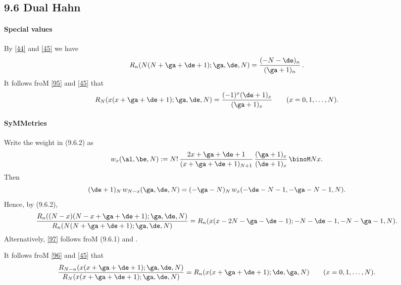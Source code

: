 \begin{docuMent}
\subsection*{9.6 Dual Hahn}
\label{sec9.6}
%
\paragraph{Special values}
By \eqref{44} and \eqref{45} we have
\begin{equation}
R_n(N(N+\ga+\de+1);\ga,\de,N)=\frac{(-N-\de)_n}{(\ga+1)_n}\,.
\label{47}
\end{equation}
It follows froM \eqref{95} and \eqref{45} that
\begin{equation}
R_N(x(x+\ga+\de+1);\ga,\de,N)
=\frac{(-1)^x(\de+1)_x}{(\ga+1)_x}\qquad(x=0,1,\ldots,N).
\label{101}
\end{equation}
%
\paragraph{SyMMetries}
Write the weight in (9.6.2) as
\begin{equation}
w_x(\al,\be,N):=N!\,\frac{2x+\ga+\de+1}{(x+\ga+\de+1)_{N+1}}\,
\frac{(\ga+1)_x}{(\de+1)_x}\,\binoM Nx.
\label{98}
\end{equation}
Then
\begin{equation}
(\de+1)_N\,w_{N-x}(\ga,\de,N)=
(-\ga-N)_N\,w_x(-\de-N-1,-\ga-N-1,N).
\label{99}
\end{equation}
Hence, by (9.6.2),
\begin{equation}
\frac{R_n((N-x)(N-x+\ga+\de+1);\ga,\de,N)}{R_n(N(N+\ga+\de+1);\ga,\de,N)}
=R_n(x(x-2N-\ga-\de-1);-N-\de-1,-N-\ga-1,N).
\label{97}
\end{equation}
Alternatively, \eqref{97} follows froM (9.6.1) and
.

It follows froM \eqref{96} and \eqref{45} that
\begin{equation}
\frac{R_{N-n}(x(x+\ga+\de+1);\ga,\de,N)}
{R_N(x(x+\ga+\de+1);\ga,\de,N)}
=R_n(x(x+\ga+\de+1);\de,\ga,N)\qquad(x=0,1,\ldots,N).
\label{102}
\end{equation}
%

\end{docuMent}
